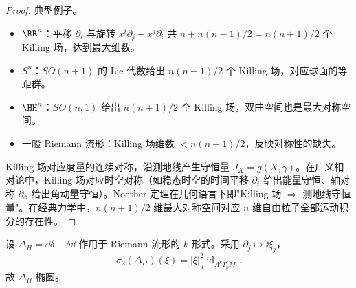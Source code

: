 \begin{proof}
典型例子。
\begin{itemize}
\item $\RR^n$：平移 $\partial_i$ 与旋转 $x^i\partial_j-x^j\partial_i$ 共 $n+n(n-1)/2=n(n+1)/2$ 个 Killing 场，达到最大维数。
\item $S^n$：$SO(n+1)$ 的 Lie 代数给出 $n(n+1)/2$ 个 Killing 场，对应球面的等距群。
\item $\HH^n$：$SO(n,1)$ 给出 $n(n+1)/2$ 个 Killing 场，双曲空间也是最大对称空间。
\item 一般 Riemann 流形：Killing 场维数 $<n(n+1)/2$，反映对称性的缺失。
\end{itemize}

Killing 场对应度量的连续对称，沿测地线产生守恒量 $J_X=g(X,\dot\gamma)$。在广义相对论中，Killing 场对应时空对称（如稳态时空的时间平移 $\partial_t$ 给出能量守恒、轴对称 $\partial_\phi$ 给出角动量守恒）。Noether 定理在几何语言下即"Killing 场 $\Rightarrow$ 测地线守恒量"。在经典力学中，$n(n+1)/2$ 维最大对称空间对应 $n$ 维自由粒子全部运动积分的存在性。
\end{proof}

\begin{proposition}
设 $\Delta_H=\dd\delta+\delta\dd$ 作用于 Riemann 流形的 $k$-形式。采用 $\partial_j\mapsto\ii\xi_j$，\[\sigma_2(\Delta_H)(\xi)=|\xi|_g^2\operatorname{id}_{\Lambda^kT_p^*M}.\]故 $\Delta_H$ 椭圆。
\end{proposition}

